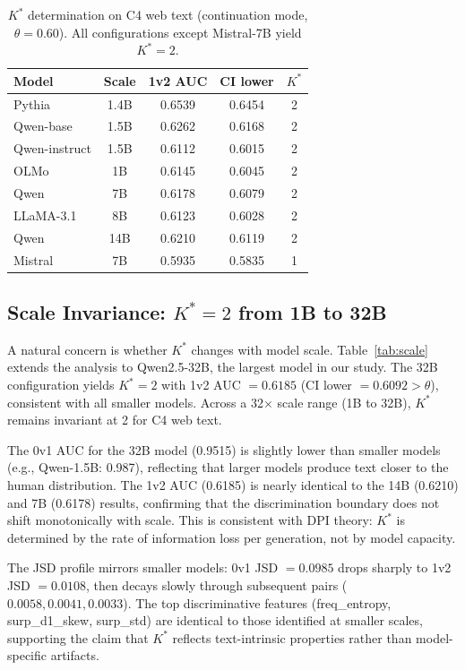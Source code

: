 \documentclass[11pt,a4paper]{article}
\begin{document}
\begin{table}[t]
\centering
\small
\caption{$K^*$ determination on C4 web text (continuation mode, $\theta\!=\!0.60$). All configurations except Mistral-7B yield $K^*\!=\!2$.}
\label{tab:c4_main}
\begin{tabular}{lcccc}
\toprule
\textbf{Model} & \textbf{Scale} & \textbf{1v2 AUC} & \textbf{CI lower} & \textbf{$K^*$} \\
\midrule
Pythia          & 1.4B & 0.6539 & 0.6454 & 2 \\
Qwen-base       & 1.5B & 0.6262 & 0.6168 & 2 \\
Qwen-instruct   & 1.5B & 0.6112 & 0.6015 & 2 \\
OLMo            & 1B   & 0.6145 & 0.6045 & 2 \\
Qwen            & 7B   & 0.6178 & 0.6079 & 2 \\
LLaMA-3.1       & 8B   & 0.6123 & 0.6028 & 2 \\
Qwen            & 14B  & 0.6210 & 0.6119 & 2 \\
\midrule
Mistral         & 7B   & 0.5935 & 0.5835 & 1 \\
\bottomrule
\end{tabular}
\end{table}

\subsection{Scale Invariance: $K^*\!=\!2$ from 1B to 32B}
\label{sec:scale}

A natural concern is whether $K^*$ changes with model scale. Table~\ref{tab:scale} extends the analysis to Qwen2.5-32B, the largest model in our study. The 32B configuration yields $K^*\!=\!2$ with 1v2 AUC $= 0.6185$ (CI lower $= 0.6092 > \theta$), consistent with all smaller models. Across a 32$\times$ scale range (1B to 32B), $K^*$ remains invariant at 2 for C4 web text.

The 0v1 AUC for the 32B model (0.9515) is slightly lower than smaller models (e.g., Qwen-1.5B: 0.987), reflecting that larger models produce text closer to the human distribution. The 1v2 AUC (0.6185) is nearly identical to the 14B (0.6210) and 7B (0.6178) results, confirming that the discrimination boundary does not shift monotonically with scale. This is consistent with DPI theory: $K^*$ is determined by the rate of information loss per generation, not by model capacity.

The JSD profile mirrors smaller models: 0v1 JSD $= 0.0985$ drops sharply to 1v2 JSD $= 0.0108$, then decays slowly through subsequent pairs ($0.0058, 0.0041, 0.0033$). The top discriminative features (freq\_entropy, surp\_d1\_skew, surp\_std) are identical to those identified at smaller scales, supporting the claim that $K^*$ reflects text-intrinsic properties rather than model-specific artifacts.
\end{document}
